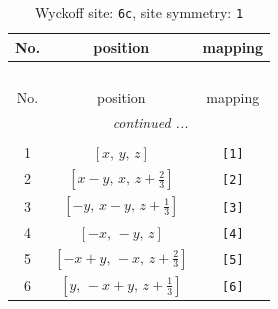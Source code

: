 \documentclass[fleqn,8pt]{jsarticle}
\begin{document}
\renewcommand{\arraystretch}{1.2}
\begin{longtable}{ccc}
\caption{Wyckoff site: {\tt 6c}, site symmetry: {\tt 1}}
 \\
 \hline \hline
No. & position & mapping \\ \hline \endfirsthead

\multicolumn{2}{l}{\tablename\ \thetable{}} \\
 \hline \hline
No. & position & mapping \\ \hline \endhead

 \hline \hline
\multicolumn{2}{r}{\footnotesize\it continued ...} \\ \endfoot

 \hline \hline
\multicolumn{2}{r}{} \\ \endlastfoot

1 & $\left[ x,\, y,\, z \right]$ & {\tt [1]} \\ \hline
2 & $\left[ x - y,\, x,\, z + \frac{2}{3} \right]$ & {\tt [2]} \\ \hline
3 & $\left[ - y,\, x - y,\, z + \frac{1}{3} \right]$ & {\tt [3]} \\ \hline
4 & $\left[ - x,\, - y,\, z \right]$ & {\tt [4]} \\ \hline
5 & $\left[ - x + y,\, - x,\, z + \frac{2}{3} \right]$ & {\tt [5]} \\ \hline
6 & $\left[ y,\, - x + y,\, z + \frac{1}{3} \right]$ & {\tt [6]} \\
\end{longtable}
\end{document}
